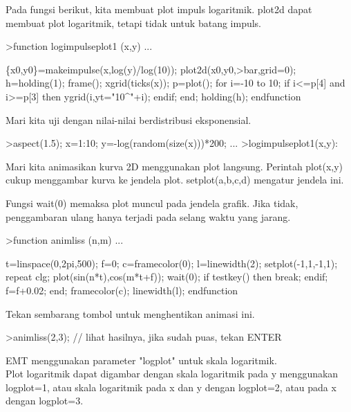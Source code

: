 \documentclass[a4paper,10pt]{article}
\begin{document}
\begin{eulernotebook}
\begin{eulercomment}
\begin{eulercomment}
\begin{eulercomment}
\begin{eulercomment}
\begin{eulercomment}
\begin{eulercomment}
\begin{eulercomment}
Pada fungsi berikut, kita membuat plot impuls logaritmik. plot2d dapat membuat plot
logaritmik, tetapi tidak untuk batang impuls.
\end{eulercomment}
\begin{eulerprompt}
>function logimpulseplot1 (x,y) ...
\end{eulerprompt}
\begin{eulerudf}
    \{x0,y0\}=makeimpulse(x,log(y)/log(10));
    plot2d(x0,y0,>bar,grid=0);
    h=holding(1);
    frame();
    xgrid(ticks(x));
    p=plot();
    for i=-10 to 10;
      if i<=p[4] and i>=p[3] then
         ygrid(i,yt="10^"+i);
      endif;
    end;
    holding(h);
  endfunction
\end{eulerudf}
\begin{eulercomment}
Mari kita uji dengan nilai-nilai berdistribusi eksponensial.
\end{eulercomment}
\begin{eulerprompt}
>aspect(1.5); x=1:10; y=-log(random(size(x)))*200; ...
>logimpulseplot1(x,y):
\end{eulerprompt}
\begin{eulercomment}
Mari kita animasikan kurva 2D menggunakan plot langsung. Perintah plot(x,y) cukup
menggambar kurva ke jendela plot. setplot(a,b,c,d) mengatur jendela ini.

Fungsi wait(0) memaksa plot muncul pada jendela grafik. Jika tidak, penggambaran ulang
hanya terjadi pada selang waktu yang jarang.
\end{eulercomment}
\begin{eulerprompt}
>function animliss (n,m) ...
\end{eulerprompt}
\begin{eulerudf}
  t=linspace(0,2pi,500);
  f=0;
  c=framecolor(0);
  l=linewidth(2);
  setplot(-1,1,-1,1);
  repeat
    clg;
    plot(sin(n*t),cos(m*t+f));
    wait(0);
    if testkey() then break; endif;
    f=f+0.02;
  end;
  framecolor(c);
  linewidth(l);
  endfunction
\end{eulerudf}
\begin{eulercomment}
Tekan sembarang tombol untuk menghentikan animasi ini.
\end{eulercomment}
\begin{eulerprompt}
>animliss(2,3); // lihat hasilnya, jika sudah puas, tekan ENTER
\end{eulerprompt}
\begin{eulercomment}
EMT menggunakan parameter "logplot" untuk skala logaritmik.\\
Plot logaritmik dapat digambar dengan skala logaritmik pada y menggunakan logplot=1,
atau skala logaritmik pada x dan y dengan logplot=2, atau pada x dengan logplot=3.


\end{eulercomment}
\end{eulercomment}
\end{eulercomment}
\end{eulercomment}
\end{eulercomment}
\end{eulercomment}
\end{eulercomment}
\end{eulernotebook}
\end{document}
